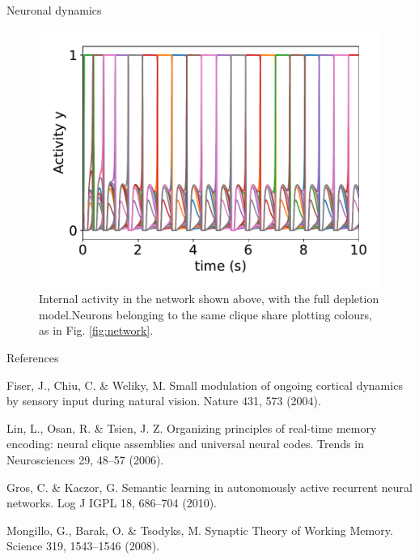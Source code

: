 \documentclass[final,hyperref={pdfpagelabels=false}]{beamer}
\begin{document}
\begin{frame}
\begin{columns}
\begin{column}{.30\textwidth}
\begin{minipage}[T]{.95\textwidth}
{\begin{block}{Neuronal dynamics}
				\begin{figure}
					\includegraphics[width=.8\linewidth]{double_activity}
					\caption{Internal activity in the network shown above, with the full depletion model.Neurons belonging to the same clique share plotting colours, as in Fig. \ref{fig:network}.}
					\label{fig:activity}
				\end{figure}
		

			
			\end{block}
			\vfil
			\begin{refblock}{References}

					\begin{thebibliography}{1}

						Fiser, J., Chiu, C. \& Weliky, M. Small modulation of ongoing cortical dynamics by sensory input during natural vision. Nature 431, 573 (2004).
						
						
						 Lin, L., Osan, R. \& Tsien, J. Z. Organizing principles of real-time memory encoding: neural clique assemblies and universal neural codes. Trends in Neurosciences 29, 48–57 (2006).
						
						Gros, C. \& Kaczor, G. Semantic learning in autonomously active recurrent neural networks. Log J IGPL 18, 686–704 (2010).
						
						Mongillo, G., Barak, O. \& Tsodyks, M. Synaptic Theory of Working Memory. Science 319, 1543–1546 (2008).

					\end{thebibliography}

			\end{refblock}

}
\end{minipage}
\end{column}
\end{columns}
\end{frame}
\end{document}
